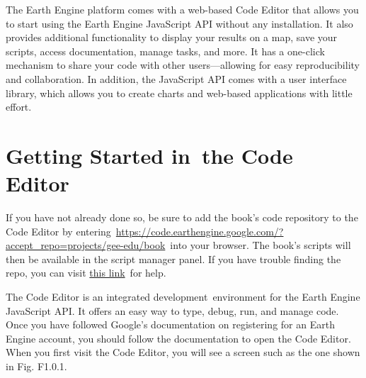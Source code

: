 \documentclass[
  letterpaper,
  DIV=11,
  numbers=noendperiod]{scrreprt}
\begin{document}
The Earth Engine platform comes with a web-based Code Editor that allows
you to start using the Earth Engine JavaScript API without any
installation. It also provides additional functionality to display your
results on a map, save your scripts, access documentation, manage tasks,
and more. It has a one-click mechanism to share your code with other
users---allowing for easy reproducibility and collaboration. In
addition, the JavaScript API comes with a user interface library, which
allows you to create charts and web-based applications with little
effort.

\hypertarget{getting-started-in-the-code-editor}{%
\section{Getting Started in~the Code
Editor}\label{getting-started-in-the-code-editor}}

If you have not already done so, be sure to add the book's code
repository to the Code Editor by
entering~\href{https://www.google.com/url?q=https://code.earthengine.google.com/?accept_repo\%3Dprojects/gee-edu/book\&sa=D\&source=editors\&ust=1670414092101269\&usg=AOvVaw2sJyDO_fhq1tcjG77pri7V}{}\href{https://www.google.com/url?q=https://code.earthengine.google.com/?accept_repo\%3Dprojects/gee-edu/book\&sa=D\&source=editors\&ust=1670414092101852\&usg=AOvVaw088kfXu4o_Mp4b8DJBPYjH}{https://code.earthengine.google.com/?accept\_repo=projects/gee-edu/book}~into
your browser. The book's scripts will then be available in the script
manager panel. If you have trouble finding the repo, you can visit
\href{https://www.google.com/url?q=https://docs.google.com/presentation/d/1Kt6wGNoesYm__Cu3k3bnlbbyPN6m9SF4hQHK-pIDHfc/edit\%23slide\%3Did.g18a7b4b055d_0_624\&sa=D\&source=editors\&ust=1670414092102526\&usg=AOvVaw3ZCmkCOjrZEWqxfjRZPOCn}{this
link}~for help.

The Code Editor is an integrated development~environment for the Earth
Engine JavaScript API. It offers an easy way to type, debug, run, and
manage code. Once you have followed Google's documentation on
registering for an Earth Engine account, you should follow the
documentation to open the Code Editor. When you first visit the Code
Editor, you will see a screen such as the one shown in Fig. F1.0.1.
\end{document}
